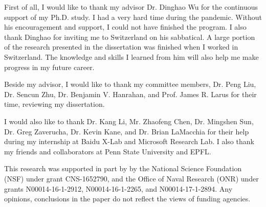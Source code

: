 First of all, I would like to thank my advisor Dr. Dinghao Wu for the continuous support of my Ph.D. study. I had a very hard time during the pandemic. Without his encouragement and support, I could not have finished the program. I also thank Dinghao for inviting me to Switzerland on his sabbatical. A large portion of the research presented in the dissertation was finished when I worked in Switzerland. The knowledge and skills I learned from him will also help me make progress in my future career.

Beside my advisor, I would like to thank my committee members, Dr. Peng Liu, Dr. Sencun Zhu, Dr. Benjamin V. Hanrahan, and Prof. James R. Larus for their time, reviewing my dissertation.

I would also like to thank Dr. Kang Li, Mr. Zhaofeng Chen, Dr. Mingshen Sun, Dr. Greg Zaverucha, Dr. Kevin Kane, and Dr. Brian LaMacchia for their help during my internship at Baidu X-Lab and Microsoft Research Lab.  I also thank my friends and collaborators at Penn State University and EPFL. 

This research was supported in part by by the National Science Foundation (NSF) under grant CNS-1652790, and the Office of Naval Research (ONR) under grants N00014-16-1-2912, N00014-16-1-2265, and N00014-17-1-2894. Any opinions, conclusions in the paper do not reflect the views of funding agencies.

